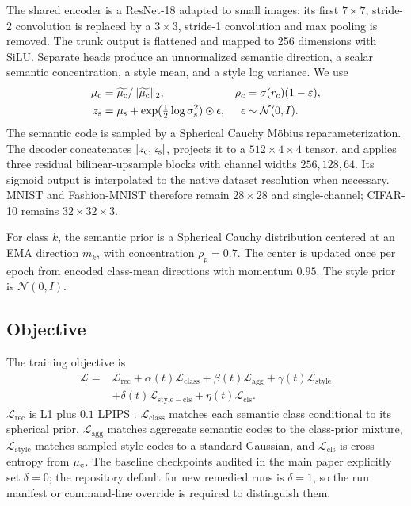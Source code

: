 The shared encoder is a ResNet-18 adapted to small images: its first
$7\times7$, stride-2 convolution is replaced by a $3\times3$, stride-1
convolution and max pooling is removed.  The trunk output is flattened and
mapped to 256 dimensions with SiLU.  Separate heads produce an unnormalized
semantic direction, a scalar semantic concentration, a style mean, and a
style log variance.  We use
\begin{align}
\mu_{\mathrm{c}}&=\widetilde{\mu_{\mathrm{c}}}/\|\widetilde{\mu_{\mathrm{c}}}\|_2, &
\rho_c&=\sigma(r_c)(1-\varepsilon),\\
z_{\mathrm{s}}&=\mu_{\mathrm{s}}+\exp(\tfrac12\log\sigma_s^2)\odot\epsilon,
&\epsilon&\sim\mathcal N(0,I).
\end{align}
The semantic code is sampled by a Spherical Cauchy M\"obius
reparameterization.  The decoder concatenates $[z_{\mathrm{c}};z_{\mathrm{s}}]$, projects it to a
$512\times4\times4$ tensor, and applies three residual bilinear-upsample
blocks with channel widths $256,128,64$.  Its sigmoid output is interpolated
to the native dataset resolution when necessary.  MNIST and Fashion-MNIST
therefore remain $28\times28$ and single-channel; CIFAR-10 remains
$32\times32\times3$.

For class $k$, the semantic prior is a Spherical Cauchy distribution centered
at an EMA direction $m_k$, with concentration $\rho_p=0.7$.  The center is
updated once per epoch from encoded class-mean directions with momentum
$0.95$.  The style prior is $\mathcal N(0,I)$.

\subsection{Objective}

The training objective is
\begin{align}
\mathcal L={}&\mathcal L_{\mathrm{rec}}
+\alpha(t)\mathcal L_{\mathrm{class}}
+\beta(t)\mathcal L_{\mathrm{agg}}
+\gamma(t)\mathcal L_{\mathrm{style}}\nonumber\\
&+\delta(t)\mathcal L_{\mathrm{style-cls}}
+\eta(t)\mathcal L_{\mathrm{cls}}.
\end{align}
$\mathcal L_{\mathrm{rec}}$ is L1 plus $0.1$ LPIPS
\citep{zhang2018unreasonable}.  $\mathcal L_{\mathrm{class}}$ matches each
semantic class conditional to its spherical prior, $\mathcal L_{\mathrm{agg}}$
matches aggregate semantic codes to the class-prior mixture,
$\mathcal L_{\mathrm{style}}$ matches sampled style codes to a standard
Gaussian, and $\mathcal L_{\mathrm{cls}}$ is cross entropy from $\mu_{\mathrm{c}}$.
The baseline checkpoints audited in the main paper explicitly set
$\delta=0$; the repository default for new remedied runs is $\delta=1$, so
the run manifest or command-line override is required to distinguish them.

